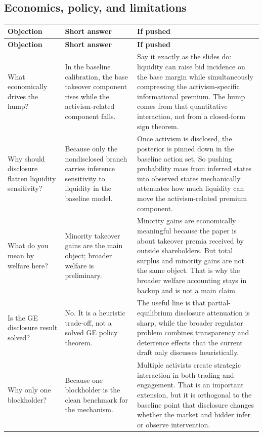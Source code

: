 \documentclass[9pt,a4paper]{extarticle}
\begin{document}
\subsection{Economics, policy, and limitations}

{\footnotesize
\begin{longtable}{@{}P{0.24\textwidth}P{0.22\textwidth}P{0.48\textwidth}@{}}
\toprule
\textbf{Objection} & \textbf{Short answer} & \textbf{If pushed} \\
\midrule
\endfirsthead
\toprule
\textbf{Objection} & \textbf{Short answer} & \textbf{If pushed} \\
\midrule
\endhead
What economically drives the hump? &
In the baseline calibration, the base takeover component rises while the activism-related component falls. &
Say it exactly as the slides do: liquidity can raise bid incidence on the base margin while simultaneously compressing the activism-specific informational premium. The hump comes from that quantitative interaction, not from a closed-form sign theorem. \\

Why should disclosure flatten liquidity sensitivity? &
Because only the nondisclosed branch carries inference sensitivity to liquidity in the baseline model. &
Once activism is disclosed, the posterior is pinned down in the baseline action set. So pushing probability mass from inferred states into observed states mechanically attenuates how much liquidity can move the activism-related premium component. \\

What do you mean by welfare here? &
Minority takeover gains are the main object; broader welfare is preliminary. &
Minority gains are economically meaningful because the paper is about takeover premia received by outside shareholders. But total surplus and minority gains are not the same object. That is why the broader welfare accounting stays in backup and is not a main claim. \\

Is the GE disclosure result solved? &
No. It is a heuristic trade-off, not a solved GE policy theorem. &
The useful line is that partial-equilibrium disclosure attenuation is sharp, while the broader regulator problem combines transparency and deterrence effects that the current draft only discusses heuristically. \\

Why only one blockholder? &
Because one blockholder is the clean benchmark for the mechanism. &
Multiple activists create strategic interaction in both trading and engagement. That is an important extension, but it is orthogonal to the baseline point that disclosure changes whether the market and bidder infer or observe intervention. \\


\end{longtable}}
\end{document}
